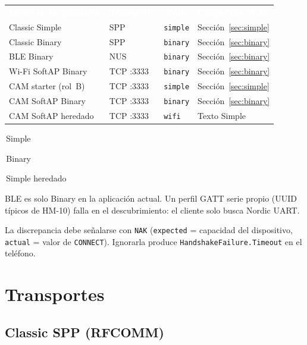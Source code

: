 \documentclass[12pt,a4paper]{article}
\newcommand{\thc}[1]{\textcolor{white}{\bfseries #1}}
\newcommand{\chip}[2]{\colorbox{#1}{\strut\,\scriptsize #2\,}}
\begin{document}
\begin{center}
\renewcommand{\arraystretch}{1.25}
\begin{tabular}{>{\raggedright\arraybackslash}p{3.5cm}
                >{\centering\arraybackslash}p{2.3cm}
                >{\centering\arraybackslash}p{1.8cm}
                >{\raggedright\arraybackslash}p{3.8cm}}
\rowcolor{TblHead}
\thc{Modo en la aplicación} & \thc{Transporte} & \thc{proto} & \thc{Carga tras ACK} \\
\rowcolor{TblChan}
Classic Simple & SPP & \texttt{simple} & Sección~\ref{sec:simple} \\
\rowcolor{TblTelem}
Classic Binary & SPP & \texttt{binary} & Sección~\ref{sec:binary} \\
\rowcolor{TblTelem}
BLE Binary & NUS & \texttt{binary} & Sección~\ref{sec:binary} \\
\rowcolor{TblTelem}
Wi-Fi SoftAP Binary & TCP :3333 & \texttt{binary} & Sección~\ref{sec:binary} \\
\rowcolor{TblChan}
CAM starter (rol~B) & TCP :3333 & \texttt{simple} & Sección~\ref{sec:simple} \\
\rowcolor{TblTelem}
CAM SoftAP Binary & TCP :3333 & \texttt{binary} & Sección~\ref{sec:binary} \\
\rowcolor{TblId}
CAM SoftAP heredado & TCP :3333 & \texttt{wifi} & Texto Simple \\
\end{tabular}

\vspace{0.4em}
\chip{TblChan}{Simple}
\chip{TblTelem}{Binary}
\chip{TblId}{Simple heredado}
\end{center}

BLE es solo Binary en la aplicación actual.
Un perfil GATT serie propio (UUID típicos de HM-10) falla en el descubrimiento:
el cliente solo busca Nordic UART.

La discrepancia debe señalarse con \texttt{NAK} (\texttt{expected} = capacidad
del dispositivo, \texttt{actual} = valor de \texttt{CONNECT}).
Ignorarla produce \texttt{HandshakeFailure.Timeout} en el teléfono.

\section{Transportes}
\label{sec:pipes}

\subsection{Classic SPP (RFCOMM)}
\end{document}

